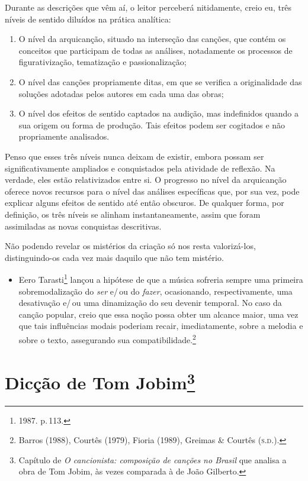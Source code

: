Durante as descrições que vêm aí, o leitor perceberá nitidamente, creio
eu, três níveis de sentido diluídos na prática analítica:

\begin{enumerate}%
\item O nível da arquicanção, situado na interseção das canções, que contém
os conceitos que participam de todas as análises, notadamente os
processos de figurativização, tematização e passionalização;

\item O nível das canções propriamente ditas, em que se verifica a
originalidade das soluções adotadas pelos autores em cada uma das obras;

\item O nível dos efeitos de sentido captados na audição, mas indefinidos
quando a sua origem ou forma de produção. Tais efeitos podem ser
cogitados e não propriamente analisados.
\end{enumerate}

Penso que esses três níveis nunca deixam de existir, embora possam ser
significativamente ampliados e conquistados pela atividade de reflexão.
Na verdade, eles estão relativizados entre si. O progresso no nível da
arquicanção oferece novos recursos para o nível das análises específicas
que, por sua vez, pode explicar alguns efeitos de sentido até então
obscuros. De qualquer forma, por definição, os três níveis se alinham
instantaneamente, assim que foram assimiladas as novas conquistas
descritivas.

Não podendo revelar os mistérios da criação só nos resta valorizá-los,
distinguindo-os cada vez mais daquilo que não tem mistério.

\begin{itemize}
\item
  Eero Tarasti\footnote{1987. p.\,113.} lançou a hipótese de que a música sofreria
  sempre uma primeira sobremodalização do \textit{ser} e/\,ou do \textit{fazer},
  ocasionando, respectivamente, uma desativação e/\,ou uma dinamização do
  seu devenir temporal. No caso da canção popular, creio que essa noção
  possa obter um alcance maior, uma vez que tais influências modais
  poderiam recair, imediatamente, sobre a melodia e sobre o texto,
  assegurando sua compatibilidade.\footnote{Barros (1988), Courtês (1979), Fioria (1989), Greimas \& Courtês (\textsc{s.d.}).}
\end{itemize}

\chapter{Dicção de Tom Jobim\footnote{Capítulo de \textit{O cancionista: composição de canções no Brasil} que analisa a obra de Tom Jobim, às vezes comparada à de João Gilberto.}}

